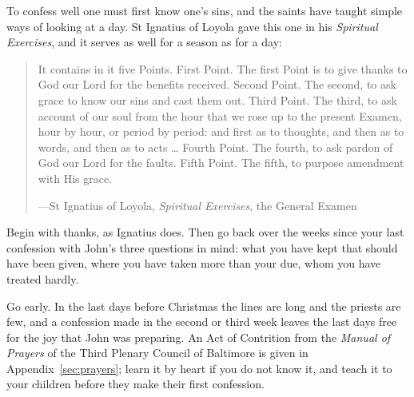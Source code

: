 To confess well one must first know one's sins, and the saints have taught
simple ways of looking at a day. St Ignatius of Loyola gave this one in his
\emph{Spiritual Exercises}, and it serves as well for a season as for a day:

\begin{quote}
It contains in it five Points. First Point. The first Point is to give thanks to
God our Lord for the benefits received. Second Point. The second, to ask grace
to know our sins and cast them out. Third Point. The third, to ask account of
our soul from the hour that we rose up to the present Examen, hour by hour, or
period by period: and first as to thoughts, and then as to words, and then as to
acts \ldots{} Fourth Point. The fourth, to ask pardon of God our Lord for the
faults. Fifth Point. The fifth, to purpose amendment with His grace.\par
{\smallskip\noindent\small ---St Ignatius of Loyola, \emph{Spiritual Exercises}, the General Examen\par}
\end{quote}

\noindent Begin with thanks, as Ignatius does. Then go back over the weeks since
your last confession with John's three questions in mind: what you have kept
that should have been given, where you have taken more than your due, whom you
have treated hardly.

Go early. In the last days before Christmas the lines are long and the priests
are few, and a confession made in the second or third week leaves the last days
free for the joy that John was preparing. An Act of Contrition from the
\emph{Manual of Prayers} of the Third Plenary Council of Baltimore is given in Appendix~\ref{sec:prayers}; learn it by heart if you do not know it,
and teach it to your children before they make their first confession.
